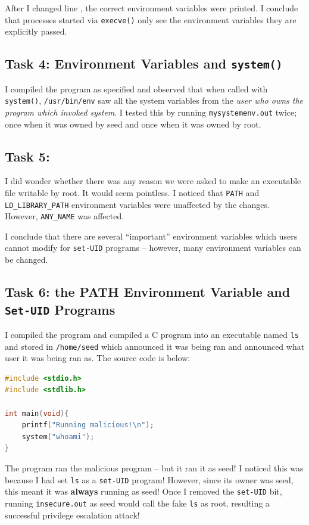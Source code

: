 \documentclass[10pt,\jkfside,a4paper]{article}
\newcommand*\circled[1]{\tikz[baseline=(char.base)]{
            \node[shape=circle,draw,inner sep=0.2pt] (char) {#1};}}
\begin{document}
After I changed line \circled{1}, the correct environment variables were
printed. I conclude that processes started via \texttt{execve()} only see
the environment variables they are explicitly passed.

\subsection{Task 4: Environment Variables and \texttt{system()}}

I compiled the program as specified and observed that when called with
\texttt{system()}, \texttt{/usr/bin/env} saw all the system variables from
the \textit{user who owns the program which invoked system}. I tested this 
by running \texttt{mysystemenv.out} twice; once when it was owned by seed 
and once when it was owned by root.

\subsection{Task 5: }

I did wonder whether there was any reason we were asked to make an
executable file writable by root. It would seem pointless. I noticed that
\texttt{PATH} and \texttt{LD\_LIBRARY\_PATH} environment variables were
unaffected by the changes. However, \texttt{ANY\_NAME} was affected.

I conclude that there are several ``important'' environment variables which
users cannot modify for \texttt{set-UID} programs -- however, many environment
variables can be changed.

\subsection{Task 6: the PATH Environment Variable and \texttt{Set-UID} Programs}

I compiled the program and compiled a C program into an executable
named \texttt{ls} and stored in \texttt{/home/seed} which announced it was
being ran and announced what user it was being ran as. The source code is
below:
\begin{lstlisting}[language=C]
#include <stdio.h>
#include <stdlib.h>

int main(void){
    printf("Running malicious!\n");
    system("whoami");
}
\end{lstlisting}

The program ran the malicious program -- but it ran it as seed! I noticed
this was because I had set \texttt{ls} as a \texttt{set-UID} program!
However, since its owner was seed, this meant it was
\textbf{always} running as seed! Once I removed the \texttt{set-UID} bit,
running \texttt{insecure.out} as seed would call the fake \texttt{ls} as
root, resulting a successful privilege escalation attack!
\end{document}
